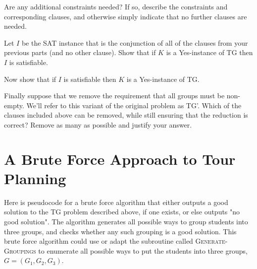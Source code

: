 \documentclass[11pt,fleqn]{exam}
\newif\ifsolutions\solutionsfalse
\begin{document}
\begin{questions}
\question[2]
Are any additional constraints needed? If so, describe the constraints and corresponding clauses, and otherwise simply indicate that no further clauses are needed.

    \ifsolutions
    
    \fi
\question[3]
Let $I$ be the SAT instance that is the conjunction of all of the clauses from your previous parts (and no other clause). Show that if $K$ is a Yes-instance of TG then $I$ is satisfiable.

    \ifsolutions
    
\fi

\question[3]
Now show that if $I$ is satisfiable then $K$ is a Yes-instance of TG.

    \ifsolutions
    
    \fi
    
\question[4]
  Finally suppose that we remove the requirement that all groups must be non-empty.
We'll refer to this variant of the original problem as TG'.
  Which of the clauses included above can be removed, while still ensuring that the reduction is correct? Remove as many as possible and justify your answer.

  \ifsolutions
    
\fi
\end{questions}

\clearpage

\section{A Brute Force Approach to Tour Planning}
Here is pseudocode for a brute force algorithm that either outputs a good solution to the TG problem described above, if one exists, or else outputs "no good solution". The algorithm generates all possible ways to group students into three groups, and checks whether any such grouping is a good solution. This brute force algorithm could use or adapt the subroutine called \textsc{Generate-Groupings} to enumerate all possible ways to put the students into three groups, $G = (G_1,G_2,G_3)$. 

\vspace{.2in}
\end{document}
